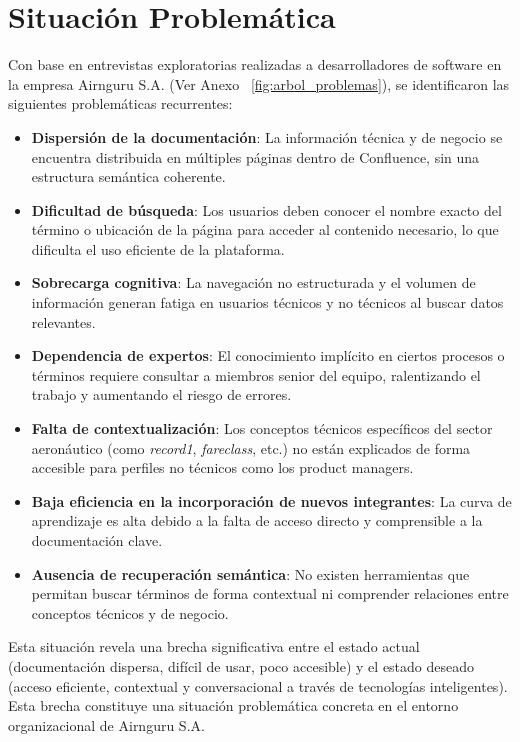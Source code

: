 \chapter{Situación Problemática}
Con base en entrevistas exploratorias realizadas a desarrolladores de software en la empresa Airnguru S.A. (Ver Anexo ~\ref{fig:arbol_problemas}), se identificaron las siguientes problemáticas recurrentes:

\begin{itemize}
  \item \textbf{Dispersión de la documentación}: La información técnica y de negocio se encuentra distribuida en múltiples páginas dentro de Confluence, sin una estructura semántica coherente.
  
  \item \textbf{Dificultad de búsqueda}: Los usuarios deben conocer el nombre exacto del término o ubicación de la página para acceder al contenido necesario, lo que dificulta el uso eficiente de la plataforma.
  
  \item \textbf{Sobrecarga cognitiva}: La navegación no estructurada y el volumen de información generan fatiga en usuarios técnicos y no técnicos al buscar datos relevantes.
  
  \item \textbf{Dependencia de expertos}: El conocimiento implícito en ciertos procesos o términos requiere consultar a miembros senior del equipo, ralentizando el trabajo y aumentando el riesgo de errores.
  
  \item \textbf{Falta de contextualización}: Los conceptos técnicos específicos del sector aeronáutico (como \textit{record1}, \textit{fareclass}, etc.) no están explicados de forma accesible para perfiles no técnicos como los product managers.
  
  \item \textbf{Baja eficiencia en la incorporación de nuevos integrantes}: La curva de aprendizaje es alta debido a la falta de acceso directo y comprensible a la documentación clave.
  
  \item \textbf{Ausencia de recuperación semántica}: No existen herramientas que permitan buscar términos de forma contextual ni comprender relaciones entre conceptos técnicos y de negocio.
\end{itemize}

Esta situación revela una brecha significativa entre el estado actual (documentación dispersa, difícil de usar, poco accesible) y el estado deseado (acceso eficiente, contextual y conversacional a través de tecnologías inteligentes). Esta brecha constituye una situación problemática concreta en el entorno organizacional de Airnguru S.A.


